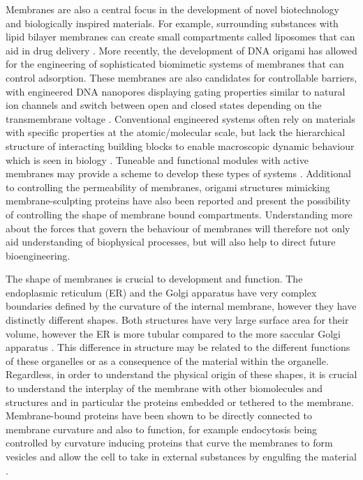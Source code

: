 Membranes are also a central focus in the development of novel biotechnology and biologically inspired materials. For example, surrounding substances with lipid bilayer membranes can create small compartments called liposomes that can aid in drug delivery \cite{lasic_applications_1995}. More recently, the development of DNA origami \cite{rothemund_folding_2006} has allowed for the engineering of sophisticated biomimetic systems of membranes that can control adsorption. These membranes are also candidates for controllable barriers, with engineered DNA nanopores displaying gating properties similar to natural ion channels and switch between open and closed states depending on the transmembrane voltage \cite{seifert_bilayer-spanning_2015}. Conventional engineered systems often rely on materials with specific properties at the atomic/molecular scale, but lack the hierarchical structure of interacting building blocks to enable macroscopic dynamic behaviour which is seen in biology \cite{studart_biologically_2015}. Tuneable and functional modules with active membranes may provide a scheme to develop these types of systems \cite{czogalla_dna_2016}. Additional to controlling the permeability of membranes, origami structures mimicking membrane-sculpting proteins have also been reported \cite{czogalla_amphipathic_2015} and present the possibility of controlling the shape of membrane bound compartments. Understanding more about the forces that govern the behaviour of membranes will therefore not only aid understanding of biophysical processes, but will also help to direct future bioengineering.

The shape of membranes is crucial to development and function. The endoplasmic reticulum (ER) and the Golgi apparatus have very complex boundaries defined by the curvature of the internal membrane, however they have distinctly different shapes. Both structures have very large surface area for their volume, however the ER is more tubular compared to the more saccular Golgi apparatus \cite{zimmerberg_how_2006}. This difference in structure may be related to the different functions of these organelles or as a consequence of the material within the organelle. Regardless, in order to understand the physical origin of these shapes, it is crucial to understand the interplay of the membrane with other biomolecules and structures and in particular the proteins embedded or tethered to the membrane. Membrane-bound proteins have been shown to be directly connected to membrane curvature and also to function, for example endocytosis being controlled by curvature inducing proteins that curve the membranes to form vesicles and allow the cell to take in external substances by engulfing the material \cite{boucrot_endophilin_2015}.

